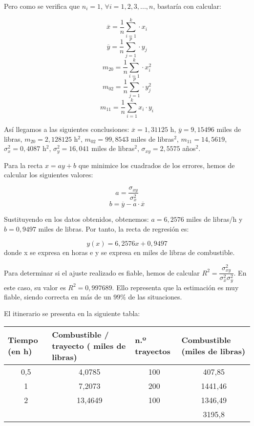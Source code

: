 Pero como se verifica que $n_i = 1$, $\forall i = 1,2,3,...,n$, bastaría con calcular: 

$$\overline{x} = \frac{1}{n}\sum_{i=1}^{k}·x_i$$
$$\overline{y} = \frac{1}{n}\sum_{j=1}^{p}·y_j$$
$$m_{20} = \frac{1}{n}\sum_{i=1}^{k}·x_i^2$$
$$m_{02} = \frac{1}{n}\sum_{j=1}^{p}·y_j^2$$
$$m_{11} = \frac{1}{n}\sum_{i=1}^{k}x_i·y_i$$

Así llegamos a las siguientes conclusiones: $\overline{x} = 1,31125$ h, $\overline{y} = 9,15496$ miles de libras, $m_{20} = 2,128125$ h$^2$, $m_{02} = 99,8543$ miles de libras$^2$, $m_{11} = 14,5619$, $ \sigma_x^2 = 0,4087$ h$^2$, $ \sigma_y^2 = 16,041$ miles de libras$^2$, $ \sigma_{xy} =2,5575$ años$^2$.

Para la recta $x = ay + b$ que minimice los cuadrados de los errores, hemos de calcular los siguientes valores:

$$a = \frac{\sigma_{xy}}{\sigma_x^2}$$
$$b = \overline{y} - a·\overline{x}$$

Sustituyendo en los datos obtenidos, obtenemos: $a=6,2576$ miles de libras/h y $b=0,9497$ miles de libras. Por tanto, la recta de regresión es:

$$ y(x) = 6,2576x + 0,9497 $$ donde x se expresa en horas e y se expresa en miles de libras de combustible. 

Para determinar si el ajuste realizado es fiable, hemos de calcular $R^2 = \dfrac{\sigma_{xy}^2}{\sigma_x^2\sigma_y^2}$. En este caso, su valor es $R^2 = 0,997689$. Ello representa que la estimación es muy fiable, siendo correcta en más de un $99 \%$ de las situaciones. 

El itinerario se presenta en la siguiente tabla: 

\tiny
	\begin{center}
		\begin{tabular}{|c|c|c|c|}
			\hline
			\multicolumn{1}{|l|}{Tiempo (en h)} & \multicolumn{1}{l|}{Combustible / trayecto ( miles de libras)} & \multicolumn{1}{l|}{n.º trayectos} & \multicolumn{1}{l|}{Combustible (miles de libras)} \\ \hline
			0,5 & 4,0785 & 100 & 407,85 \\ 
			1 & 7,2073 & 200 & 1441,46 \\ 
			2 & 13,4649 & 100 & 1346,49 \\ \hline
			\multicolumn{1}{|l|}{} & \multicolumn{1}{l|}{} &  & 3195,8 \\ \hline
		\end{tabular}
	\end{center}
\normalsize

